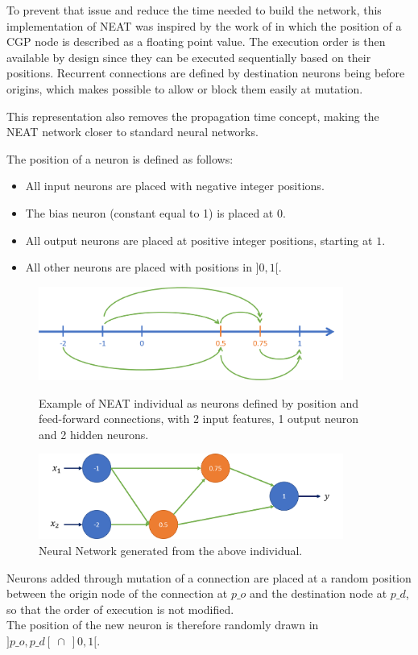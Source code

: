 To prevent that issue and reduce the time needed to build the network, this implementation of NEAT was inspired by the work of \cite{wilson2018positionalcgp} in which the position of a CGP node is described as a floating point value. The execution order is then available by design since they can be executed sequentially based on their positions. Recurrent connections are defined by destination neurons being before origins, which makes possible to allow or block them easily at mutation. 

This representation also removes the propagation time concept, making the NEAT network closer to standard neural networks. 

The position of a neuron is defined as follows:
\begin{itemize}
    \item All input neurons are placed with negative integer positions.  
    \item The bias neuron (constant equal to 1) is placed at $0$.  
    \item All output neurons are placed at positive integer positions, starting at $1$.
    \item All other neurons are placed with positions in $]0, 1[$.
\end{itemize}

\begin{figure}[H]
\centering
\captionsetup{justification=centering,margin=2cm}
\includegraphics[width=10cm]{images/NEAT_position.png}
\caption{Example of NEAT individual as neurons defined by position and feed-forward connections, with 2 input features, 1 output neuron and 2 hidden neurons.}
\includegraphics[width=10cm]{images/NEAT_network.png}
\caption{Neural Network generated from the above individual.}
 \label{NEAT_network}
\end{figure}

Neurons added through mutation of a connection are placed at a random position between the origin node of the connection at $p\_o$ and the destination node at $p\_d$, so that the order of execution is not modified. \\
The position of the new neuron is therefore randomly drawn in $]p\_o, p\_d[ \: \cap \: ]0, 1[$.

